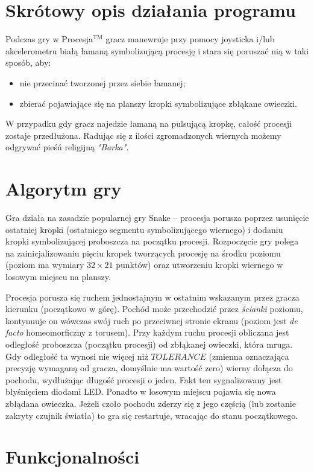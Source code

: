 \documentclass[a4paper,12pt,twoside]{article}
\theoremstyle{plain}
\theoremstyle{definition}
\theoremstyle{remark}
\begin{document}
\section{Skrótowy opis działania programu}
Podczas gry w Procesja$^{\textrm{TM}}$ gracz manewruje przy pomocy joysticka i/lub akcelerometru białą łamaną symbolizującą procesję i stara się poruszać nią w taki sposób, aby:
\begin{itemize}
	\item nie przecinać tworzonej przez siebie łamanej; 
	\item zbierać pojawiające się na planszy kropki symbolizujące zbłąkane owieczki.
\end{itemize}

W przypadku gdy gracz najedzie łamaną na pulsującą kropkę, całość procesji zostaje przedłużona. Radując się z ilości zgromadzonych wiernych możemy odgrywać pieśń religijną \textit{"Barka"}.

\section{Algorytm gry}
Gra działa na zasadzie popularnej gry Snake -- procesja porusza poprzez usunięcie ostatniej kropki (ostatniego segmentu symbolizującego wiernego) i dodaniu kropki symbolizującej proboszcza na początku procesji. Rozpoczęcie gry polega na zainicjalizowaniu pięciu kropek tworzących procesję na środku poziomu (poziom ma wymiary $32 \times 21$ punktów) oraz utworzeniu kropki wiernego w losowym miejscu na planszy.

Procesja porusza się ruchem jednostajnym w ostatnim wskazanym przez gracza kierunku (początkowo w górę). Pochód może przechodzić przez \textit{ścianki} poziomu, kontynuuje on wówczas swój ruch po przeciwnej stronie ekranu (poziom jest \textit{de facto} homeomorficzny z torusem). Przy każdym ruchu procesji obliczana jest odległość proboszcza (początku procesji) od zbłąkanej owieczki, która mruga. Gdy odległość ta wynosi nie więcej niż $TOLERANCE$ (zmienna oznaczająca precyzję wymaganą od gracza, domyślnie ma wartość zero) wierny dołącza do pochodu, wydłużając długość procesji o jeden. Fakt ten sygnalizowany jest błyśnięciem diodami LED. Ponadto w losowym miejscu pojawia się nowa zbłądana owieczka. Jeżeli czoło pochodu zderzy się z jego częścią (lub zostanie zakryty czujnik światła) to gra się restartuje, wracając do stanu początkowego. 
\section{Funkcjonalności}
\end{document}
